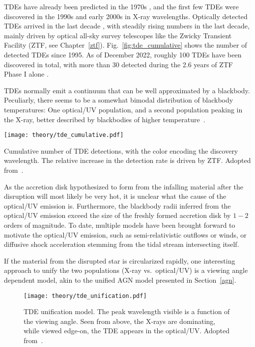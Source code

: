 TDEs have already been predicted in the 1970s , and the first few TDEs were discovered in the 1990s and early 2000s in X-ray wavelengths. Optically detected TDEs arrived in the last decade , with steadily rising numbers in the last decade, mainly driven by optical all-sky survey telescopes like the Zwicky Transient Facility (ZTF, see Chapter~\ref{ztf}). Fig.~\ref{fig:tde_cumulative} shows the number of detected TDEs since 1995. As of December 2022, roughly 100 TDEs have been discovered in total, with more than 30 detected during the 2.6 years of ZTF Phase I alone .

TDEs normally emit a continuum that can be well approximated by a blackbody. Peculiarly, there seems to be a somewhat bimodal distribution of blackbody temperatures: One optical/UV population, and a second population peaking in the X-ray, better described by blackbodies of higher temperature~\cite{Gezari2021}.

\begin{marginfigure}
    \texttt{[image: theory/tde\_cumulative.pdf]}
    \caption[TDE detections]{Cumulative number of TDE detections, with the color encoding the discovery wavelength. The relative increase in the detection rate is driven by ZTF\@. Adopted from~\cite{Gezari2021}.}
\end{marginfigure}

As the accretion disk hypothesized to form from the infalling material after the disruption will most likely be very hot, it is unclear what the cause of the optical/UV emission is. Furthermore, the blackbody radii inferred from the optical/UV emission exceed the size of the freshly formed accretion disk by $1-2$ orders of magnitude. To date, multiple models have been brought forward to motivate the optical/UV emission, such as semi-relativistic outflows or winds, or diffusive shock acceleration stemming from the tidal stream intersecting itself.

If the material from the disrupted star is circularized rapidly, one interesting approach to unify the two populations (X-ray vs.\ optical/UV) is a viewing angle dependent model, akin to the unified AGN model presented in Section~\ref{agn}.

\begin{figure}[htb]
    \texttt{[image: theory/tde\_unification.pdf]}
    \caption[TDE Unification]{TDE unification model. The peak wavelength visible is a function of the viewing angle. Seen from above, the X-rays are dominating, while viewed edge-on, the TDE appears in the optical/UV\@. Adopted from~\cite{Hayasaki2021}.}
\end{figure}

